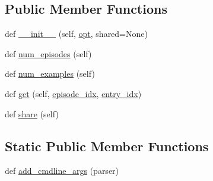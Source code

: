 \subsection*{Public Member Functions}
\begin{DoxyCompactItemize}
\item 
def \hyperlink{classparlai_1_1tasks_1_1dialogue__safety_1_1base__agent_1_1__BaseSafetyTeacher_a30315340193b3ddc6edde594193b3325}{\+\_\+\+\_\+init\+\_\+\+\_\+} (self, \hyperlink{classparlai_1_1tasks_1_1dialogue__safety_1_1base__agent_1_1__BaseSafetyTeacher_a72d5420bf860ece2469f704aff6a4741}{opt}, shared=None)
\item 
def \hyperlink{classparlai_1_1tasks_1_1dialogue__safety_1_1base__agent_1_1__BaseSafetyTeacher_ab42e92e403d07dcd0f211a2c2732c2d9}{num\+\_\+episodes} (self)
\item 
def \hyperlink{classparlai_1_1tasks_1_1dialogue__safety_1_1base__agent_1_1__BaseSafetyTeacher_a8f42bbbc9060a3afaf53cc5c125e1bd7}{num\+\_\+examples} (self)
\item 
def \hyperlink{classparlai_1_1tasks_1_1dialogue__safety_1_1base__agent_1_1__BaseSafetyTeacher_afde2a1fdb6fa5aa3da3544624f8068b6}{get} (self, \hyperlink{classparlai_1_1core_1_1teachers_1_1FixedDialogTeacher_afd4ebab8063eb42d182d30a1a41f133e}{episode\+\_\+idx}, \hyperlink{classparlai_1_1core_1_1teachers_1_1FixedDialogTeacher_ae3201b15f3c3b46a2f3511bad9b43e7d}{entry\+\_\+idx})
\item 
def \hyperlink{classparlai_1_1tasks_1_1dialogue__safety_1_1base__agent_1_1__BaseSafetyTeacher_a563ca65dea3b938cf25a4e4853d23c62}{share} (self)
\end{DoxyCompactItemize}
\subsection*{Static Public Member Functions}
\begin{DoxyCompactItemize}
\item 
def \hyperlink{classparlai_1_1tasks_1_1dialogue__safety_1_1base__agent_1_1__BaseSafetyTeacher_ac00c909c61e5622dd2053c14f898414d}{add\+\_\+cmdline\+\_\+args} (parser)
\end{DoxyCompactItemize}
